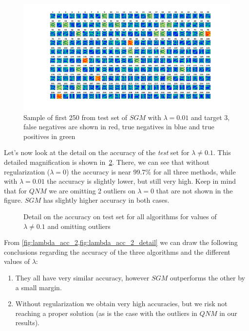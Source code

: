 \begin{figure}[H]
    \includegraphics[width=\textwidth]{../src/SGM_te_plot_2k_001.png}
    \caption{Sample of first 250 from test set of $SGM$ with $\lambda=0.01$ and target 3,
    false negatives are shown in red, true negatives in blue and true positives in green}
    \label{fig:fneg-001}
\end{figure}

\pagebreak
Let's now look at the detail on the accuracy of the \emph{test} set for
$\lambda \neq 0.1$. This detailed magnification is shown in~\cref{fig:lambda_acc_2_detail}.
There, we can see that without regularization ($\lambda = 0$) the accuracy is
near 99.7\% for all three methods, while with $\lambda = 0.01$ the accuracy is slightly
lower, but still very high. Keep in mind that for $QNM$ we are omitting 2 outliers on
$\lambda = 0$ that are not shown in the figure. $SGM$ has slightly higher accuracy in
both cases.

\begin{figure}[H]
    
    \caption{Detail on the accuracy on test set for all algorithms for values of $\lambda \neq 0.1$ and
    omitting outliers}
    \label{fig:lambda_acc_2_detail}
\end{figure}

From \cref{fig:lambda_acc_2,fig:lambda_acc_2_detail} we can draw the following conclusions regarding
the accuracy of the three algorithms and the different values of $\lambda$:
\begin{enumerate}
    \item They all have very similar accuracy, however $SGM$ outperforms the other by a
        small margin.
    \item Without regularization we obtain very high accuracies, but we risk not reaching
        a proper solution (as is the case with the outliers in $QNM$ in our results).
\end{enumerate}

